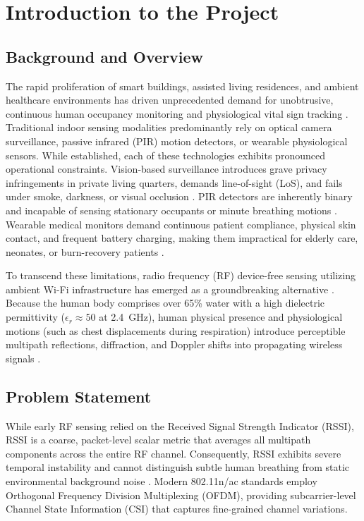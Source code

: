 \chapter{Introduction to the Project}
\label{chap:intro}

\section{Background and Overview}
The rapid proliferation of smart buildings, assisted living residences, and ambient healthcare environments has driven unprecedented demand for unobtrusive, continuous human occupancy monitoring and physiological vital sign tracking \cite{jalal2022human, patwari2014breathing}. Traditional indoor sensing modalities predominantly rely on optical camera surveillance, passive infrared (PIR) motion detectors, or wearable physiological sensors. While established, each of these technologies exhibits pronounced operational constraints. Vision-based surveillance introduces grave privacy infringements in private living quarters, demands line-of-sight (LoS), and fails under smoke, darkness, or visual occlusion \cite{lara2013survey}. PIR detectors are inherently binary and incapable of sensing stationary occupants or minute breathing motions \cite{wang2015understanding}. Wearable medical monitors demand continuous patient compliance, physical skin contact, and frequent battery charging, making them impractical for elderly care, neonates, or burn-recovery patients \cite{xiao2013pilot}.

To transcend these limitations, radio frequency (RF) device-free sensing utilizing ambient Wi-Fi infrastructure has emerged as a groundbreaking alternative \cite{halperin2011tool, ma2019wifi}. Because the human body comprises over 65\% water with a high dielectric permittivity ($\epsilon_r \approx 50$ at 2.4~GHz), human physical presence and physiological motions (such as chest displacements during respiration) introduce perceptible multipath reflections, diffraction, and Doppler shifts into propagating wireless signals \cite{wang2017rt}.

\section{Problem Statement}
While early RF sensing relied on the Received Signal Strength Indicator (RSSI), RSSI is a coarse, packet-level scalar metric that averages all multipath components across the entire RF channel. Consequently, RSSI exhibits severe temporal instability and cannot distinguish subtle human breathing from static environmental background noise \cite{zeng2019farsense}. Modern 802.11n/ac standards employ Orthogonal Frequency Division Multiplexing (OFDM), providing subcarrier-level Channel State Information (CSI) that captures fine-grained channel variations.

